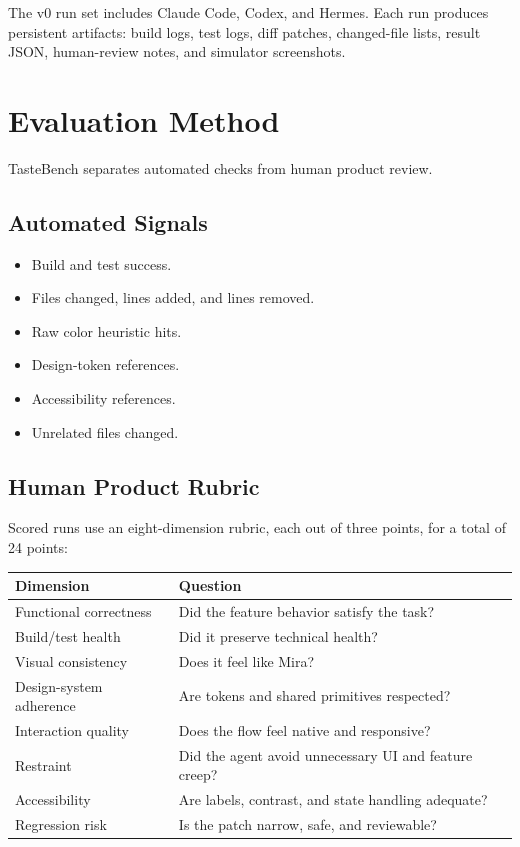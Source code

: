 \documentclass[11pt]{article}
\begin{document}
The v0 run set includes Claude Code, Codex, and Hermes. Each run produces persistent artifacts: build logs, test logs, diff patches, changed-file lists, result JSON, human-review notes, and simulator screenshots.

\section{Evaluation Method}

TasteBench separates automated checks from human product review.

\subsection{Automated Signals}

\begin{itemize}
  \item Build and test success.
  \item Files changed, lines added, and lines removed.
  \item Raw color heuristic hits.
  \item Design-token references.
  \item Accessibility references.
  \item Unrelated files changed.
\end{itemize}

\subsection{Human Product Rubric}

Scored runs use an eight-dimension rubric, each out of three points, for a total of 24 points:

\begin{center}
\begin{tabularx}{0.92\textwidth}{lX}
\toprule
\textbf{Dimension} & \textbf{Question} \\
\midrule
Functional correctness & Did the feature behavior satisfy the task? \\
Build/test health & Did it preserve technical health? \\
Visual consistency & Does it feel like Mira? \\
Design-system adherence & Are tokens and shared primitives respected? \\
Interaction quality & Does the flow feel native and responsive? \\
Restraint & Did the agent avoid unnecessary UI and feature creep? \\
Accessibility & Are labels, contrast, and state handling adequate? \\
Regression risk & Is the patch narrow, safe, and reviewable? \\
\bottomrule
\end{tabularx}
\end{center}
\end{document}
